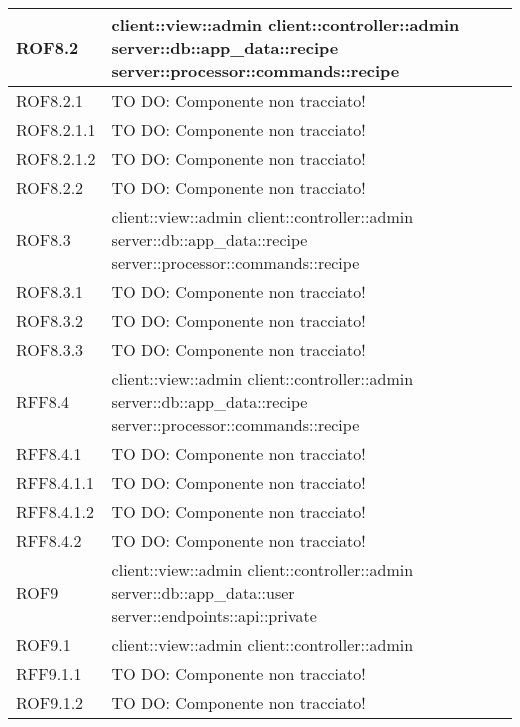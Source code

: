 \begin{center}
\begin{longtable}{| p{4cm} | p{8cm} |}
\hline
ROF8.2 & client::view::admin \newline client::controller::admin \newline server::db::app\_data::recipe \newline server::processor::commands::recipe \\
\hline
ROF8.2.1 & TO DO: Componente non tracciato! \\
\hline
ROF8.2.1.1 & TO DO: Componente non tracciato! \\
\hline
ROF8.2.1.2 & TO DO: Componente non tracciato! \\
\hline
ROF8.2.2 & TO DO: Componente non tracciato! \\
\hline
ROF8.3 & client::view::admin \newline client::controller::admin \newline server::db::app\_data::recipe \newline server::processor::commands::recipe \\
\hline
ROF8.3.1 & TO DO: Componente non tracciato! \\
\hline
ROF8.3.2 & TO DO: Componente non tracciato! \\
\hline
ROF8.3.3 & TO DO: Componente non tracciato! \\
\hline
RFF8.4 & client::view::admin \newline client::controller::admin \newline server::db::app\_data::recipe \newline server::processor::commands::recipe \\
\hline
RFF8.4.1 & TO DO: Componente non tracciato! \\
\hline
RFF8.4.1.1 & TO DO: Componente non tracciato! \\
\hline
RFF8.4.1.2 & TO DO: Componente non tracciato! \\
\hline
RFF8.4.2 & TO DO: Componente non tracciato! \\
\hline
ROF9 & client::view::admin \newline client::controller::admin \newline server::db::app\_data::user \newline server::endpoints::api::private \\
\hline
ROF9.1 & client::view::admin \newline client::controller::admin \\
\hline
RFF9.1.1 & TO DO: Componente non tracciato! \\
\hline
ROF9.1.2 & TO DO: Componente non tracciato! \\

\end{longtable}
\end{center}

